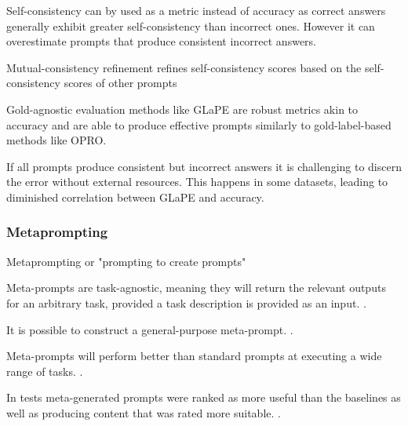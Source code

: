 Self-consistency can by used as a metric instead of accuracy as correct answers generally exhibit greater self-consistency than incorrect ones. However it can overestimate prompts that produce consistent incorrect answers. \cite{zhang2024glapegoldlabelagnosticprompt}

Mutual-consistency refinement refines self-consistency scores based on the self-consistency scores of other prompts \cite{zhang2024glapegoldlabelagnosticprompt}

Gold-agnostic evaluation methods like GLaPE are robust metrics akin to accuracy and are able to produce effective prompts similarly to gold-label-based methods like OPRO\cite{yang2024largelanguagemodelsoptimizers}. \cite{zhang2024glapegoldlabelagnosticprompt}

If all prompts produce consistent but incorrect answers it is challenging to discern the error without external resources. This happens in some datasets, leading to diminished correlation between GLaPE and accuracy. \cite{zhang2024glapegoldlabelagnosticprompt}


\subsubsection{Metaprompting}
Metaprompting or "prompting to create prompts"

Meta-prompts are task-agnostic, meaning they will return the relevant outputs for an arbitrary task, provided a task description is provided as an input.  \cite{dewynter2024metaprompting}.

It is possible to construct a general-purpose meta-prompt. \cite{dewynter2024metaprompting}.

Meta-prompts will perform better than standard prompts at executing a wide range of tasks.  \cite{dewynter2024metaprompting}.

In tests meta-generated prompts were ranked as more useful than the baselines as well as producing content that was rated more suitable.  \cite{dewynter2024metaprompting}.
